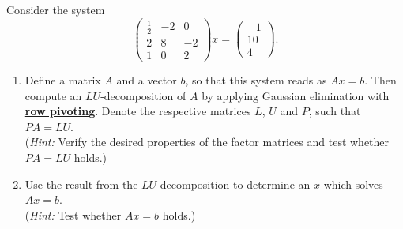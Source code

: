 Consider the system
$$
\begin{pmatrix}
	\tfrac{1}{2}&-2&0\\
	2&8&-2\\
	1&0&2
\end{pmatrix} x = 
\begin{pmatrix}
-1\\
10\\
4
\end{pmatrix}.
$$
\begin{enumerate}
	\item  Define a matrix $A$ and a vector $b$, so that this system reads as $Ax = b$. Then compute an $LU$-decomposition of $A$ by applying Gaussian elimination with \underline{\textbf{row pivoting}}. Denote the respective matrices $L$, $U$ and $P$, such that $PA = LU$.\\
	(\textit{Hint:} Verify the desired properties of the factor matrices and test whether  $PA = LU$ holds.)
	\item Use the result from the $LU$-decomposition to determine an $x$ which solves $Ax=b$.\\
	(\textit{Hint:} Test whether $Ax=b$ holds.)
\end{enumerate}